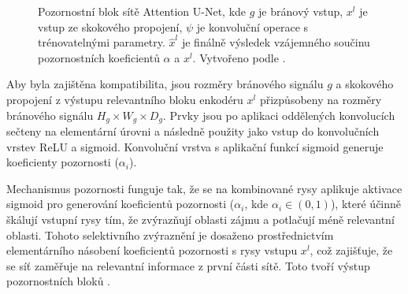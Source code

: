 \begin{figure}[H]
\caption[Pozornostní blok sítě Attention U-Net]{Pozornostní blok sítě Attention U-Net, kde $g$ je bránový vstup, $x^l$ je vstup ze skokového propojení, $\psi$ je konvoluční operace s trénovatelnými parametry. $\hat{x}^l$ je finálně výsledek vzájemného součinu pozornostních koeficientů $\alpha$ a $x^l$. Vytvořeno podle \cite{attentionunet}. }
\label{fig:attention_unet}
\end{figure}

Aby byla zajištěna kompatibilita, jsou rozměry bránového signálu $g$ a skokového propojení z výstupu relevantního bloku enkodéru $x^l$ přizpůsobeny na rozměry bránového signálu $H_g \times W_g \times D_g$. Prvky jsou po aplikaci oddělených konvolucích sečteny na elementární úrovni a následně použity jako vstup do konvolučních vrstev ReLU a sigmoid. Konvoluční vrstva s aplikační funkcí sigmoid generuje koeficienty pozornosti ($\alpha_i$).

Mechanismus pozornosti funguje tak, že se na kombinované rysy aplikuje aktivace sigmoid pro generování koeficientů pozornosti (\(\alpha_i\), kde \(\alpha_i \in (0, 1)\)), které účinně škálují vstupní rysy tím, že zvýrazňují oblasti zájmu a potlačují méně relevantní oblasti. Tohoto selektivního zvýraznění je dosaženo prostřednictvím elementárního násobení koeficientů pozornosti s rysy vstupu $x^l$, což zajišťuje, že se síť zaměřuje na relevantní informace z první části sítě. Toto tvoří výstup pozornostních bloků \cite{attentionunet}.

\endinput